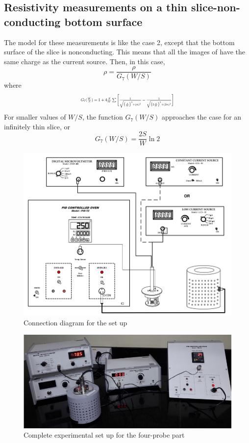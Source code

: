 \documentclass[%
 aip,
 amsmath,amssymb,
 reprint,%
]{revtex4-1}
\begin{document}
\subsection{Resistivity measurements on a thin slice-non-conducting bottom surface}
The model for these measurements is like the case 2, except that the bottom surface of
the slice is nonconducting. This means that all the images of  have the same charge as
the current source. Then, in this case,
\begin{equation}
    \rho = \dfrac{\rho}{G_7 (W/S)}
\end{equation}
where
\begin{equation}
    \resizebox{0.4\textwidth}{!}{$G_7 (\frac{W}{S}) = 1 + 4 \frac{S}{W} \sum
        \Bigg[ \frac{1}{\sqrt{\big(\frac{S}{W} \big)^2 + (n)^2}} - \frac{1}{\sqrt{\big(2 \frac{S}{W} \big)^2 + (2n)^2}}\Bigg]$}
\end{equation}
For smaller
values of $W/S$, the function $G_7 (W/S)$ approaches the case for an infinitely thin slice, or
\begin{equation}
\label{g7ws}
    G_7 (W/S) = \dfrac{2S}{W} \ln 2
\end{equation}
\begin{figure}
    \centering
    \includegraphics[scale = 0.8]{Figures/connection-diagram.png}
    \caption{Connection diagram for the set up}
    \label{fig:connector}
\end{figure}
\begin{figure}
    \centering
    \includegraphics[scale = 0.5]{Figures/experimental-setup.png}
    \caption{Complete experimental set up for the four-probe part}
    \label{fig:set-up}
\end{figure}
\end{document}
